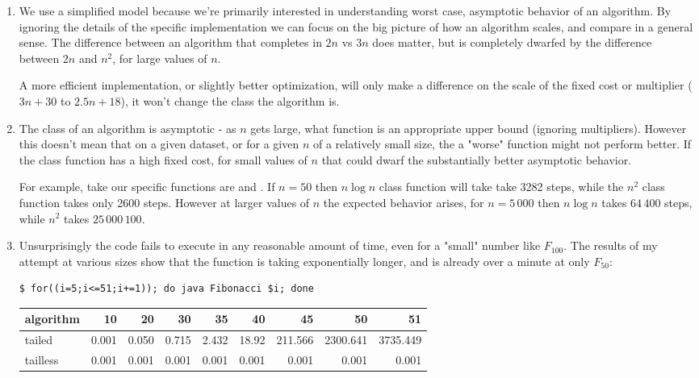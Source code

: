 \documentclass[12pt]{chmullighw}
\begin{document}
\begin{enumerate}

\item We use a simplified model because we're primarily interested in
understanding worst case, asymptotic behavior of an algorithm. By ignoring the
details of the specific implementation we can focus on the big picture of how an
algorithm scales, and compare in a general sense. The difference between an algorithm
that completes in $2n$ vs $3n$ does matter, but is completely dwarfed by the
difference between $2n$ and $n^2$, for large values of $n$. 

A more efficient implementation, or slightly better optimization, will only make
a difference on the scale of the fixed cost or multiplier ($3n+30$ to $2.5n+18$),
it won't change the class the algorithm is.


\item The class of an algorithm is asymptotic - as $n$ gets large, what function
is an appropriate upper bound (ignoring multipliers). However this doesn't mean
that on a given dataset, or for a given $n$ of a relatively small size, the
a "worse" function might not perform better. If the  class function
has a high fixed cost, for small values of $n$ that could dwarf the substantially
better asymptotic behavior. 

For example, take our specific functions are  and
. If $n = 50$ then $n \log n$ class function will take take
3282 steps, while the $n^2$ class function takes only 2600 steps. However at
larger values of $n$ the expected behavior arises, for $n = 5\,000$ then $n \log n$
takes $64\,400$ steps, while $n^2$ takes $25\,000\,100$.


\item


Unsurprisingly the code fails to execute in any reasonable amount of time, even
for a "small" number like $F_{100}$. The results of my attempt at various sizes
show that the function is taking exponentially longer, and is already over a minute
at only $F_{50}$:

\begin{verbatim}
$ for((i=5;i<=51;i+=1)); do java Fibonacci $i; done
\end{verbatim}
\begin{tabular}{l|*{7}{r|}r}
algorithm & 10 & 20 & 30 & 35 & 40 & 45 & 50 & 51\\
\hline
tailed & 0.001 & 0.050 & 0.715 & 2.432 & 18.92 & 211.566 & 2300.641 & 3735.449\\
\hline
tailless & 0.001 & 0.001 & 0.001 & 0.001 & 0.001 & 0.001 & 0.001 & 0.001
\end{tabular}


\end{enumerate}
\end{document}
